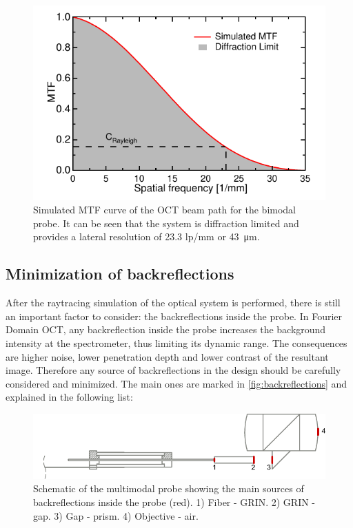 \begin{figure}[h!]\centering
      \includegraphics{figures/30_DesignSimulation/Optical/MTF/MTF_Sim.pdf}
      \caption{Simulated MTF curve of the OCT beam path for the bimodal probe. It can be seen that the system is diffraction limited and provides a lateral resolution of 23.3 lp/mm or \SI{43}{\micro\meter}.}
      \label{fig:MTFsim}
\end{figure}

\subsection{Minimization of backreflections}
After the raytracing simulation of the optical system is performed, there is still an important factor to consider: the backreflections inside the probe. In Fourier Domain OCT, any backreflection inside the probe increases the background intensity at the spectrometer, thus limiting its dynamic range. The consequences are higher noise, lower penetration depth and lower contrast of the resultant image. Therefore any source of backreflections in the design should be carefully considered and minimized. The main ones are marked in \autoref{fig:backreflections} and explained in the following list:

\begin{figure}[h!]\centering
      \includegraphics{figures/30_DesignSimulation/Optical/Backreflections/backreflections.pdf}
      \caption{Schematic of the multimodal probe showing the main sources of backreflections inside the probe (red). 1) Fiber - GRIN. 2) GRIN - gap. 3) Gap - prism. 4) Objective - air. }
      \label{fig:backreflections}
\end{figure}

